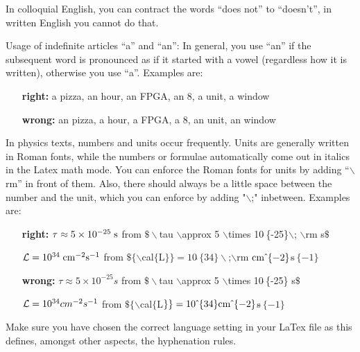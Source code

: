 \documentclass[bachelor,       %
               twoside,        %
               BCOR10mm,       %
               ngerman,english  %
               ]{GAUBM}
\begin{document}
In colloquial English, you can contract the words ``does not'' to
``doesn't'', in written English you cannot do that.

Usage of indefinite articles ``a'' and ``an'': In general, you use
``an'' if the subsequent word is pronounced as if it started with a
vowel (regardless how it is written), otherwise you use ``a''. Examples are:
\begin{enumerate}
\item[\bf right:] a pizza, an hour, an FPGA, an 8, a unit, a window
\item[\bf wrong:] an pizza, a hour, a FPGA, a 8, an unit, an window
\end{enumerate}

In physics texts, numbers and units occur frequently. Units are
generally written in Roman fonts, while the numbers or formulae
automatically come out in italics in the Latex math mode. You can
enforce the Roman fonts for units by adding ``$\backslash$rm'' in
front of them. Also, there should always be a little space between the
number and the unit, which you can enforce by adding "$\backslash$;"
inbetween. Examples are:
\begin{enumerate}
\item[\bf right:] $\tau \approx 5 \times 10^{-25}\;\rm s$ from 
                  $\$\backslash$tau $\backslash$approx 5 $\backslash$times 10$\hat{\ }$\{-25\}$\backslash$; $\backslash$rm s$\$$
\item[\bf       ] ${\cal{L}} = 10^{34}\;\rm cm^{-2}s^{-1}$ from 
                  $\$\{\backslash$cal$\{$L$\}\} = 10\hat{\ }\{34\}{\backslash}$;$\backslash$rm $\rm cm\hat{\ }\{-2\}$s$\hat{\ }\{-1\}$
\item[\bf wrong:] $\tau \approx 5 \times 10^{-25}s$\; from
                  $\$\backslash$tau $\backslash$approx 5 $\backslash$times 10$\hat{\ }$\{-25\} s$\$$
\item[\bf       ] ${\cal{L}} = 10^{34}cm^{-2}s^{-1}$ from
                  $\$\{\backslash$cal$\{$L$\}\} = 10\hat{\ }\{34\}\rm cm\hat{\ }\{-2\}$s$\hat{\ }\{-1\}$
\end{enumerate}

Make sure you have chosen the correct language setting in your LaTex
file as this defines, amongst other aspects, the hyphenation rules.
\end{document}
